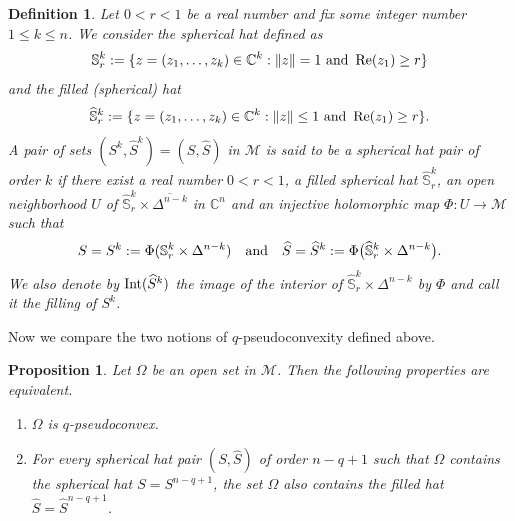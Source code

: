 \documentclass[11pt,a4paper]{article}
\newtheorem{prop}[lem]{Proposition}
\newtheorem{defn}[lem]{Definition}
\newcommand{\CC}{\mathbb{C}}
\renewcommand{\SS}{\mathbb{S}}
\newcommand{\Mcal}{\mathcal{M}}
\newcommand{\Repa}[1]{\operatorname{Re}(#1)}
\newcommand{\Int}{\hbox{Int}}
\newcommand{\qand}{\quad \hbox{and} \quad}
\begin{document}
\begin{defn}\label{defn-qpsc-hats} Let $0 < r < 1$ be a real number and fix some integer number $1 \leq k \leq n$. We consider the \emph{spherical hat} defined as
\[
\SS_r^k := \{z=(z_1,\ldots,z_k) \in \CC^k : \|z\|=1 \ \hbox{and}\ \Repa{z_1} \geq r\}
\]
and the \emph{filled (spherical) hat}
\[
\widehat{\SS}_r^k := \{z=(z_1,\ldots,z_k) \in \CC^k : \|z\|\leq 1 \ \hbox{and}\ \Repa{z_1} \geq r\}.
\]
A pair of sets $(S^k,\widehat{S}^k)=(S, \widehat{S})$ in $\Mcal$ is said to be a \emph{spherical hat pair of order $k$} if there exist a real number $0<r<1$, a filled spherical hat $\widehat{\SS}_r^{k}$, an open neighborhood $U$ of $\widehat{\SS}_r^{k} \times \overline{\Delta^{n-k}}$ in $\CC^n$ and an injective holomorphic map $\Phi:U\to\Mcal$ such that 
\[
S=S^k:=\Phi(\SS_r^{k}\times\Delta^{n-k}) \qand \widehat{S}=\widehat{S}^k:=\Phi\big(\widehat{\SS}_r^{k}\times\Delta^{n-k}\big).
\] 
We also denote by $\Int(\widehat{S}^k)$ the image of the interior of $\widehat{\SS}_r^{k}\times\Delta^{n-k}$ by $\Phi$ and call it the \emph{filling of} $S^k$.
\end{defn}

Now we compare the two notions of $q$-pseudoconvexity defined above.

\begin{prop} \label{prop-qpsc-caps} Let $\Omega$ be an open set in $\Mcal$. Then the following properties are equivalent.

\begin{enumerate}

\item \label{prop-qpsc-caps-1}  $\Omega$ is $q$-pseudoconvex.

\item \label{prop-qpsc-caps-4} For every spherical hat pair $(S,\widehat{S})$ of order $n-q+1$ such that $\Omega$ contains the spherical hat $S=S^{n-q+1}$, the set $\Omega$ also contains the filled hat $\widehat{S}=\widehat{S}^{n-q+1}$.



\end{enumerate}

\end{prop}
\end{document}
